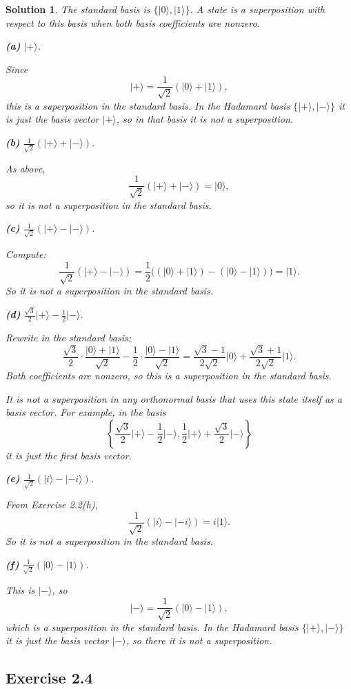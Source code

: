 \documentclass[11pt,a4paper]{article}
\theoremstyle{sol}
\newtheorem*{solution}{Solution}
\newcommand{\ket}[1]{\lvert #1\rangle}
\begin{document}
\begin{solution}
The standard basis is $\{\ket{0},\ket{1}\}$. A state is a superposition with respect to this basis when both basis coefficients are nonzero.

\textbf{(a)} $\ket{+}$.

Since
\[
\ket{+}=\frac{1}{\sqrt2}(\ket{0}+\ket{1}),
\]
this is a superposition in the standard basis. In the Hadamard basis $\{\ket{+},\ket{-}\}$ it is just the basis vector $\ket{+}$, so in that basis it is \emph{not} a superposition.

\textbf{(b)} $\frac{1}{\sqrt2}(\ket{+}+\ket{-})$.

As above,
\[
\frac{1}{\sqrt2}(\ket{+}+\ket{-})=\ket{0},
\]
so it is not a superposition in the standard basis.

\textbf{(c)} $\frac{1}{\sqrt2}(\ket{+}-\ket{-})$.

Compute:
\[
\frac{1}{\sqrt2}(\ket{+}-\ket{-})
=\frac{1}{2}\bigl((\ket{0}+\ket{1})-(\ket{0}-\ket{1})\bigr)
=\ket{1}.
\]
So it is not a superposition in the standard basis.

\textbf{(d)} $\frac{\sqrt3}{2}\ket{+}-\frac12\ket{-}$.

Rewrite in the standard basis:
\[
\frac{\sqrt3}{2}\cdot\frac{\ket{0}+\ket{1}}{\sqrt2}
-\frac12\cdot\frac{\ket{0}-\ket{1}}{\sqrt2}
=\frac{\sqrt3-1}{2\sqrt2}\ket{0}
+\frac{\sqrt3+1}{2\sqrt2}\ket{1}.
\]
Both coefficients are nonzero, so this is a superposition in the standard basis.

It is not a superposition in any orthonormal basis that uses this state itself as a basis vector. For example, in the basis
\[
\left\{
\frac{\sqrt3}{2}\ket{+}-\frac12\ket{-},
\frac12\ket{+}+\frac{\sqrt3}{2}\ket{-}
\right\}
\]
it is just the first basis vector.

\textbf{(e)} $\frac{1}{\sqrt2}(\ket{i}-\ket{-i})$.

From Exercise 2.2(h),
\[
\frac{1}{\sqrt2}(\ket{i}-\ket{-i})=i\ket{1}.
\]
So it is not a superposition in the standard basis.

\textbf{(f)} $\frac{1}{\sqrt2}(\ket{0}-\ket{1})$.

This is $\ket{-}$, so
\[
\ket{-}=\frac{1}{\sqrt2}(\ket{0}-\ket{1}),
\]
which \emph{is} a superposition in the standard basis. In the Hadamard basis $\{\ket{+},\ket{-}\}$ it is just the basis vector $\ket{-}$, so there it is not a superposition.
\end{solution}

\clearpage
\subsection*{Exercise 2.4}
\end{document}
